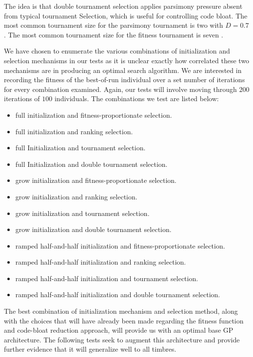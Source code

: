 \documentclass[12pt]{report} 	%
\numberwithin{figure}{chapter}
\numberwithin{table}{chapter}
\numberwithin{equation}{chapter}
\begin{document}
\begin{flushleft}
\begin{description}
The idea is that double tournament selection applies parsimony pressure absent from typical tournament Selection, which is useful for controlling code bloat. The most common tournament size for the parsimony tournament is two with $D = 0.7$. The most common tournament size for the fitness tournament is seven \cite[p. 21]{luke2006comparison}.
\end{description}

We have chosen to enumerate the various combinations of initialization and selection mechanisms in our tests as it is unclear exactly how correlated these two mechanisms are in producing an optimal search algorithm. We are interested in recording the fitness of the best-of-run individual over a set number of iterations for every combination examined. Again, our tests will involve moving through $200$ iterations of $100$ individuals. The combinations we test are listed below:
\begin{itemize}
\item full initialization and fitness-proportionate selection.
\item full initialization and ranking selection.
\item full Initialization and tournament selection.
\item full Initialization and double tournament selection.
\item grow initialization and fitness-proportionate selection.
\item grow initialization and ranking selection.
\item grow initialization and tournament selection.
\item grow initialization and double tournament selection.
\item ramped half-and-half initialization and fitness-proportionate selection.
\item ramped half-and-half initialization and ranking selection.
\item ramped half-and-half initialization and tournament selection.
\item ramped half-and-half initialization and double tournament selection.
\end{itemize}
The best combination of initialization mechanism and selection method, along with the choices  that will have already been made regarding the fitness function and code-bloat reduction approach, will provide us with an optimal base GP architecture. The following tests seek to augment this architecture and provide further evidence that it will generalize well to all timbres.


\end{flushleft}
\end{document}
